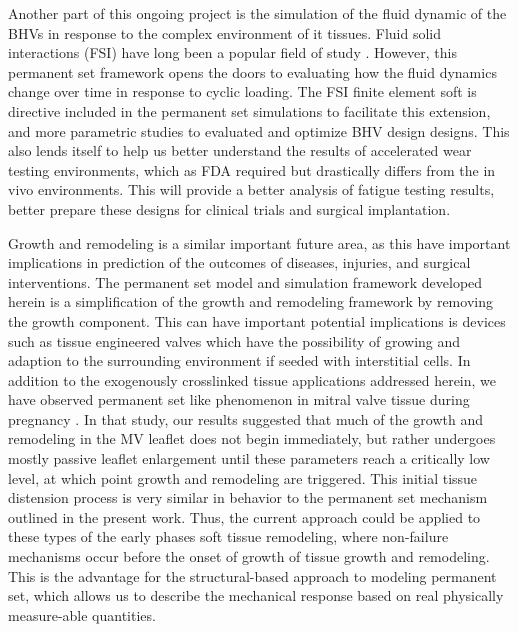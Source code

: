     
    Another part of this ongoing project is the simulation of the fluid dynamic of the BHVs in response to the complex environment of it tissues. Fluid solid interactions (FSI) have long been a popular field of study \cite{kamensky_immersogeometric_2015}\cite{hsu_dynamic_2015}\cite{wu_anisotropic_2018}\cite{kiendl_isogeometric_2015}. However, this permanent set framework opens the doors to evaluating how the fluid dynamics change over time in response to cyclic loading. The FSI finite element soft is directive included in the permanent set simulations to facilitate this extension, and more parametric studies to evaluated and optimize BHV design designs. This also lends itself to help us better understand the results of accelerated wear testing environments, which as FDA required but drastically differs from the in vivo environments. This will provide a better analysis of fatigue testing results, better prepare these designs for clinical trials and surgical implantation. 
    
    
    Growth and remodeling is a similar important future area, as this have important implications in prediction of the outcomes of diseases, injuries, and surgical interventions. The permanent set model and simulation framework developed herein is a simplification of the growth and remodeling framework by removing the growth component. This can have important potential implications is devices such as tissue engineered valves which have the possibility of growing and adaption to the surrounding environment if seeded with interstitial cells. In addition to the exogenously crosslinked tissue applications addressed herein, we have observed permanent set like phenomenon in mitral valve tissue during pregnancy \cite{rego_mitral_2016}. In that study, our results suggested that much of the growth and remodeling in the MV leaflet does not begin immediately, but rather undergoes mostly passive leaflet enlargement until these parameters reach a critically low level, at which point growth and remodeling are triggered. This initial tissue distension process is very similar in behavior to the permanent set mechanism outlined in the present work. Thus, the current approach could be applied to these types of the early phases soft tissue remodeling, where non-failure mechanisms occur before the onset of growth of tissue growth and remodeling. This is the advantage for the structural-based approach to modeling permanent set, which allows us to describe the mechanical response based on real physically measure-able quantities. 
    
    


    
 
